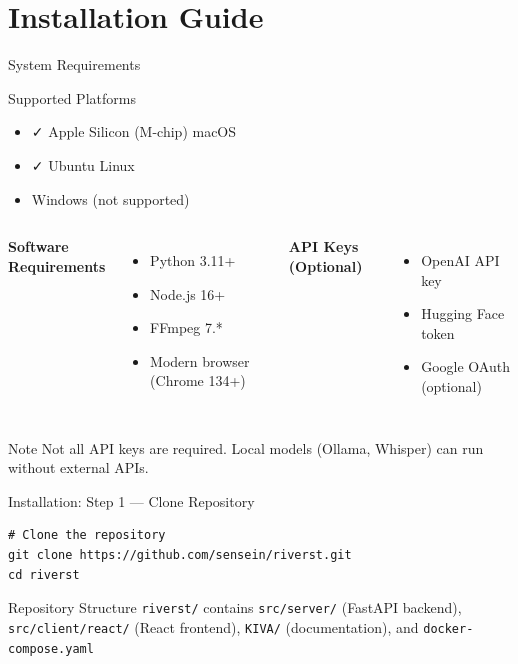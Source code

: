 \documentclass[aspectratio=169]{beamer}
\begin{document}
\section{Installation Guide}

\begin{frame}[fragile]{System Requirements}
\begin{block}{Supported Platforms}
\begin{itemize}
    \item \textcolor{kivagreen}{\faCheck} Apple Silicon (M-chip) macOS
    \item \textcolor{kivagreen}{\faCheck} Ubuntu Linux
    \item \textcolor{kivared}{\faTimes} Windows (not supported)
\end{itemize}
\end{block}

\vspace{0.3cm}

\begin{columns}[T]
\textbf{Software Requirements}
\begin{itemize}
    \item Python 3.11+
    \item Node.js 16+
    \item FFmpeg 7.*
    \item Modern browser (Chrome 134+)
\end{itemize}

\textbf{API Keys (Optional)}
\begin{itemize}
    \item OpenAI API key
    \item Hugging Face token
    \item Google OAuth (optional)
\end{itemize}
\end{columns}

\vspace{0.3cm}
\begin{alertblock}{Note}
Not all API keys are required. Local models (Ollama, Whisper) can run without external APIs.
\end{alertblock}
\end{frame}

\begin{frame}[fragile]{Installation: Step 1 — Clone Repository}
\begin{verbatim}
# Clone the repository
git clone https://github.com/sensein/riverst.git
cd riverst
\end{verbatim}

\vspace{0.5cm}

\begin{block}{Repository Structure}
\small
\texttt{riverst/} contains \texttt{src/server/} (FastAPI backend), \texttt{src/client/react/} (React frontend), \texttt{KIVA/} (documentation), and \texttt{docker-compose.yaml}
\end{block}
\end{frame}
\end{document}

